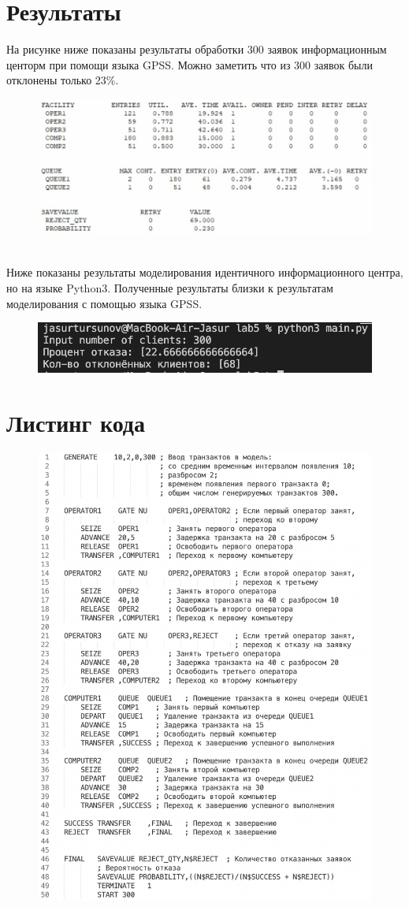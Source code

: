 \documentclass[a4paper, 12pt]{article}
\begin{document}
\section{{Результаты}}
На рисунке ниже показаны результаты обработки 300 заявок информационным центорм при помощи языка GPSS. Можно заметить что из 300 заявок были отклонены только 23\%.
\begin{figure}[h!]
	\centering \includegraphics[scale=0.5]{gpss}
\end{figure}
\\ Ниже показаны результаты моделирования идентичного информационного центра, но на языке Python3.  Полученные результаты близки к результатам моделирования с помощью языка GPSS. 
\begin{figure}[h!]
	\centering \includegraphics[scale=1]{300}
\end{figure}

\section{Листинг кода}
\begin{figure}[h!]
	\centering \includegraphics[scale=0.8]{listing}
\end{figure}
\end{document}
